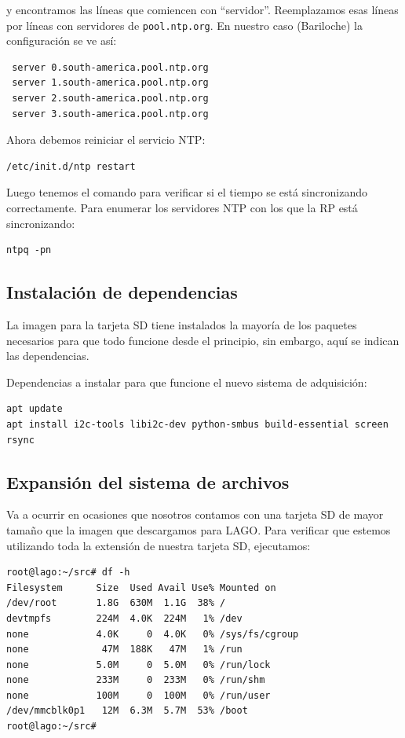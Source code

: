 \documentclass[a4paper,11pt]{article}
\begin{document}
\noindent y encontramos las líneas que comiencen con ``servidor''. Reemplazamos esas líneas
por líneas con servidores de \texttt{pool.ntp.org}. En nuestro caso (Bariloche)
la configuración se ve así:

\begin{verbatim}
 server 0.south-america.pool.ntp.org
 server 1.south-america.pool.ntp.org
 server 2.south-america.pool.ntp.org
 server 3.south-america.pool.ntp.org
\end{verbatim}

\noindent Ahora debemos reiniciar el servicio NTP:

\begin{verbatim}
/etc/init.d/ntp restart
\end{verbatim}

\noindent Luego tenemos el comando para verificar si el tiempo se está
sincronizando correctamente. Para enumerar los servidores NTP con los que la RP está
sincronizando:

\begin{verbatim}
ntpq -pn
\end{verbatim}

\subsection{Instalación de dependencias}

La imagen para la tarjeta SD tiene instalados la mayoría de los paquetes
necesarios para que todo funcione desde el principio, sin embargo, aquí se
indican las dependencias.

\noindent Dependencias a instalar para que funcione el nuevo sistema de
adquisición:

\begin{verbatim}
apt update
apt install i2c-tools libi2c-dev python-smbus build-essential screen rsync
\end{verbatim}

\subsection{Expansión del sistema de archivos}\label{subsub_expansion_sd}
Va a ocurrir en ocasiones que nosotros contamos con una tarjeta SD de mayor
tamaño que la imagen que descargamos para LAGO. Para verificar que estemos
utilizando toda la extensión de nuestra tarjeta SD, ejecutamos: 

\begin{verbatim}
root@lago:~/src# df -h
Filesystem      Size  Used Avail Use% Mounted on
/dev/root       1.8G  630M  1.1G  38% /
devtmpfs        224M  4.0K  224M   1% /dev
none            4.0K     0  4.0K   0% /sys/fs/cgroup
none             47M  188K   47M   1% /run
none            5.0M     0  5.0M   0% /run/lock
none            233M     0  233M   0% /run/shm
none            100M     0  100M   0% /run/user
/dev/mmcblk0p1   12M  6.3M  5.7M  53% /boot
root@lago:~/src# 

\end{verbatim}
\end{document}
